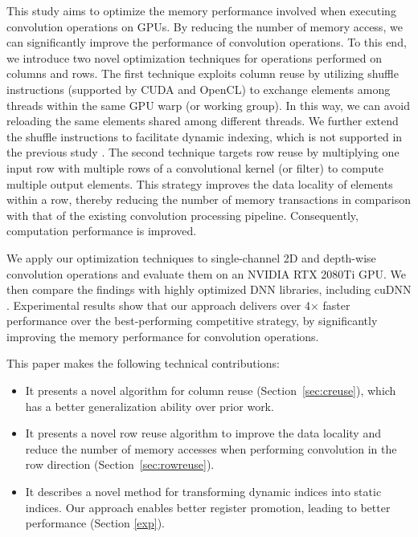 This study aims to optimize the memory {\color{red}performance} involved when executing convolution operations on GPUs. By reducing the number of
memory access, we can significantly improve the performance of convolution operations. To this end, we introduce two novel optimization
techniques for operations performed on columns and rows. The first technique exploits column reuse by utilizing shuffle instructions
(supported by CUDA and OpenCL) to exchange elements among threads within the same GPU warp (or working group). In this way, we can avoid
reloading the same elements shared among different threads. We further extend the shuffle instructions to facilitate dynamic indexing,
which is not supported in the previous study \cite{vasilache2014fast}. The second technique targets row reuse by multiplying one input row
with multiple rows of a convolutional kernel (or filter) to compute multiple output elements. This strategy improves the data locality of
elements within a row, thereby reducing the number of memory transactions in comparison with that of the existing convolution processing
pipeline. Consequently, computation performance is improved.


We apply our optimization techniques to {\color{red}single-channel 2D and depth-wise convolution} operations and evaluate them {\color{red}on an NVIDIA RTX 2080Ti GPU}. We
then compare the findings with highly optimized DNN libraries, including cuDNN \cite{ChetlurWVCTCS14}. Experimental results show that our approach delivers over
4$\times$ faster performance over the best-performing competitive strategy, by significantly {\color{red}improving the memory performance} for convolution operations.

This paper makes the following technical contributions:
\begin{itemize}
  \item It presents a novel algorithm for column reuse (Section~\ref{sec:creuse}), which has a better generalization
      ability over prior work.
  \item It presents a novel row reuse algorithm to improve the data locality and reduce the number of memory accesses
      when performing convolution in the row direction (Section~\ref {sec:rowreuse}).
  \item It describes a novel method for transforming dynamic indices into static indices. Our approach enables better
      register promotion, leading to better performance (Section \ref{exp}).
\end{itemize}
